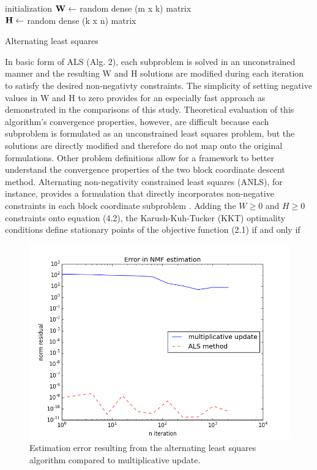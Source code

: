 \documentclass[final,leqno,onefignum,onetabnum]{siamltex1213}
\begin{document}
\begin{algorithm}[H]	

 initialization\;
$\bf{W} \gets $ random dense (m x k) matrix\\
$\bf{H} \gets $ random dense (k x n) matrix\\
 \caption{Alternating least squares}
\end{algorithm} 

In basic form of ALS (Alg. 2), each subproblem is solved in an unconstrained manner and the resulting W and H solutions are modified during each iteration to satisfy the desired non-negativty constraints. The simplicity of setting negative values in W and H to zero provides for an especially fast approach as demonstrated in the comparisons of this study. Theoretical evaluation of this algorithm's convergence properties, however, are difficult because each subproblem is formulated as an unconstrained least squares problem, but the solutions are directly modified and therefore do not map onto the original formulations. Other problem definitions allow for a framework to better understand the convergence properties of the two block coordinate descent method. Alternating non-negativity constrained least squares (ANLS), for instance, provides a formulation that directly incorporates non-negative constraints in each block coordinate subproblem \cite{Kim1}. Adding the $W \ge 0$ and  $ H \ge 0 $ constraints onto equation (4.2), the Karush-Kuh-Tucker (KKT) optimality conditions define stationary points of the objective function (2.1) if and only if

\begin{figure}[t!]
  \centering
    \includegraphics[width=.5\linewidth]{NMF_ALS_vs_multiplicative_update_iteration_error}
  \caption{Estimation error resulting from the alternating least squares algorithm compared to multiplicative update.}
\end{figure}
\end{document}
